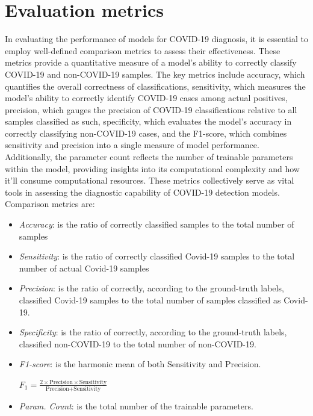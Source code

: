 \section{Evaluation metrics}
In evaluating the performance of models for COVID-19 diagnosis, it is essential to employ well-defined comparison metrics to assess their effectiveness. These metrics provide a quantitative measure of a model's ability to correctly classify COVID-19 and non-COVID-19 samples. The key metrics include accuracy, which quantifies the overall correctness of classifications, sensitivity, which measures the model's ability to correctly identify COVID-19 cases among actual positives, precision, which gauges the precision of COVID-19 classifications relative to all samples classified as such, specificity, which evaluates the model's accuracy in correctly classifying non-COVID-19 cases, and the F1-score, which combines sensitivity and precision into a single measure of model performance. Additionally, the parameter count reflects the number of trainable parameters within the model, providing insights into its computational complexity and how it'll consume computational resources. These metrics collectively serve as vital tools in assessing the diagnostic capability of COVID-19 detection models.
Comparison metrics are:
\begin{itemize}
\item \textit{Accuracy}: is the ratio of correctly classified samples to the total number of samples
\item \textit{Sensitivity}: is the ratio of correctly classified Covid-19 samples to the total number of actual Covid-19 samples 
\item \textit{Precision}: is the ratio of correctly, according to the ground-truth labels, classified Covid-19 samples to the total number of samples classified as Covid-19.
\item \textit{Specificity}: is the ratio of correctly, according to the ground-truth labels, classified non-COVID-19 to the total number of non-COVID-19.
\item \textit{F1-score}: is the harmonic mean of both Sensitivity and Precision.
\begin{center}  
 $F_{1}=\frac{2\times\text{Precision} \times \text{Sensitivity}}{\text{Precision} + \text{Sensitivity}}$
\end{center}
\item \textit{Param. Count}: is the total number of the trainable parameters.
\end{itemize}



